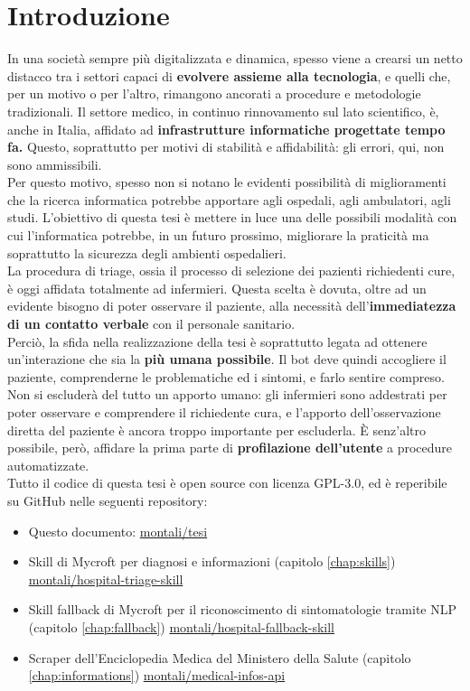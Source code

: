 \chapter{Introduzione}
\label{chap:introduzione}
In una società sempre più digitalizzata e dinamica, spesso viene a crearsi un netto distacco tra i settori capaci di \textbf{evolvere assieme alla tecnologia}, e quelli che, per un motivo o per l'altro, rimangono ancorati a procedure e metodologie tradizionali. Il settore medico, in continuo rinnovamento sul lato scientifico, è, anche in Italia, affidato ad \textbf{infrastrutture informatiche progettate tempo fa.} Questo, soprattutto per motivi di stabilità e affidabilità: gli errori, qui, non sono ammissibili. \\
Per questo motivo, spesso non si notano le evidenti possibilità di miglioramenti che la ricerca informatica potrebbe apportare agli ospedali, agli ambulatori, agli studi.
L'obiettivo di questa tesi è mettere in luce una delle possibili modalità con cui l'informatica potrebbe, in un futuro prossimo, migliorare la praticità ma soprattutto la sicurezza degli ambienti ospedalieri.\\
La procedura di triage, ossia il processo di selezione dei pazienti richiedenti cure, è oggi affidata totalmente ad infermieri. Questa scelta è dovuta, oltre ad un evidente bisogno di poter osservare il paziente, alla necessità dell'\textbf{immediatezza di un contatto verbale} con il personale sanitario. \\
Perciò, la sfida nella realizzazione della tesi è soprattutto legata ad ottenere un'interazione che sia la \textbf{più umana possibile}. Il bot deve quindi accogliere il paziente, comprenderne le problematiche ed i sintomi, e farlo sentire compreso. Non si escluderà del tutto un apporto umano: gli infermieri sono addestrati per poter osservare e comprendere il richiedente cura, e l'apporto dell'osservazione diretta del paziente è ancora troppo importante per escluderla. È senz'altro possibile, però, affidare la prima parte di \textbf{profilazione dell'utente} a procedure automatizzate.\\
Tutto il codice di questa tesi è open source con licenza GPL-3.0, ed è reperibile su GitHub nelle seguenti repository:
\begin{itemize}
    \item Questo documento: \href{https://github.com/montali/tesi}{montali/tesi}
    \item Skill di Mycroft per diagnosi e informazioni (capitolo \ref{chap:skills}) \href{https://github.com/montali/hospital-triage-skill}{montali/hospital-triage-skill}
    \item Skill fallback di Mycroft per il riconoscimento di sintomatologie tramite NLP (capitolo \ref{chap:fallback}) \href{https://github.com/montali/hospital-fallback-skill}{montali/hospital-fallback-skill}
    \item Scraper dell'Enciclopedia Medica del Ministero della Salute (capitolo \ref{chap:informations}) \href{https://github.com/montali/medical-infos-api}{montali/medical-infos-api}
\end{itemize}

